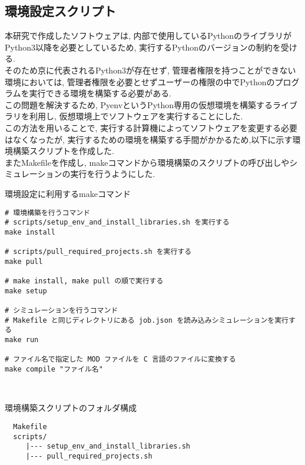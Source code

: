 \subsection{環境設定スクリプト}
本研究で作成したソフトウェアは, 内部で使用しているPythonのライブラリがPython3以降を必要としているため,
実行するPythonのバージョンの制約を受ける.\\
そのため京に代表されるPython3が存在せず, 管理者権限を持つことができない環境においては,
管理者権限を必要とせずユーザーの権限の中でPythonのプログラムを実行できる環境を構築する必要がある.\\
この問題を解決するため, Pyenv\cite{pyenv-repo}というPython専用の仮想環境を構築するライブラリを利用し,
仮想環境上でソフトウェアを実行することにした.\\
この方法を用いることで, 実行する計算機によってソフトウェアを変更する必要はなくなったが,
実行するための環境を構築する手間がかかるため,以下に示す環境構築スクリプトを作成した.\\
またMakefileを作成し, makeコマンドから環境構築のスクリプトの呼び出しやシミュレーションの実行を行うようにした.\\
\begin{table}[htb]
  \caption {環境設定に利用するmakeコマンド}
{\footnotesize
\begin{framed}
\begin{verbatim}
# 環境構築を行うコマンド
# scripts/setup_env_and_install_libraries.sh を実行する
make install

# scripts/pull_required_projects.sh を実行する
make pull

# make install, make pull の順で実行する
make setup

# シミュレーションを行うコマンド
# Makefile と同じディレクトリにある job.json を読み込みシミュレーションを実行する
make run

# ファイル名で指定した MOD ファイルを C 言語のファイルに変換する
make compile "ファイル名"
\end{verbatim}
\end{framed}
}
\end{table}
\\
\begin{table}[htb]
  \caption {環境構築スクリプトのフォルダ構成}
{\footnotesize
\begin{framed}
\begin{verbatim}
  Makefile
  scripts/
     |--- setup_env_and_install_libraries.sh
     |--- pull_required_projects.sh
\end{verbatim}
\end{framed}
}
\end{table}
